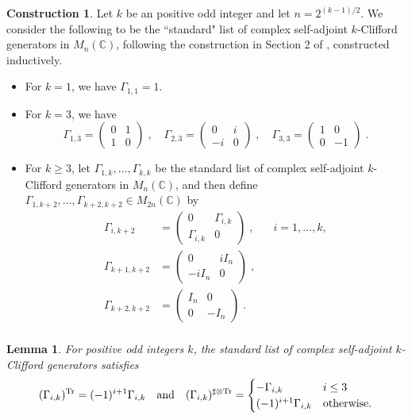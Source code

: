 \documentclass[12pt, reqno]{amsart}
\newtheorem{lemma}[thm]{Lemma}
\theoremstyle{definition}
\newtheorem{const}[thm]{Construction}
\def\C{{\mathbb C}}
\def\T{{\mathbb T}}
\def\T{ ^{\rm{Tr}}}
\def\sT{ ^{\sharp \otimes {\rm{Tr}}}}
\begin{document}
\begin{const}  \label{construction1}
Let $k$ be an positive odd integer and let $n = 2^{(k-1)/2}$. We consider the following to be the ``standard" list of complex self-adjoint $k$-Clifford generators in $M_n(\C)$, following the construction in Section 2 of \cite{SBS}, constructed inductively.
\begin{itemize} 
\item For $k = 1$, we have $\Gamma_{1,1} = 1$.
\item For $k = 3$, we have 
$$\Gamma_{1,3} = \begin{pmatrix} 0 & 1 \\ 1 & 0 \end{pmatrix} \; , \quad
\Gamma_{2,3} =  \begin{pmatrix} 0 & i \\ -i & 0 \end{pmatrix} \; , \quad
\Gamma_{3,3} =  \begin{pmatrix} 1 & 0 \\ 0 & -1 \end{pmatrix} \; .$$
\item For $k \geq 3$, let $\Gamma_{1,k}, \dots, \Gamma_{k,k}$ be the standard list of complex self-adjoint $k$-Clifford generators in $M_n(\C)$, and then define $\Gamma_{1,k+2}, \dots, \Gamma_{k+2,k+2} \in M_{2n}(\C)$ by
\begin{align*}
\Gamma_{i, k+2} &= \begin{pmatrix} 0 & \Gamma_{i, k} \\ \Gamma_{i,k} & 0 \end{pmatrix}  \; , && i = 1, \dots, k, \\
\Gamma_{k+1,k+2} &=  \begin{pmatrix} 0 & i I_{n} \\ -i I_{n} & 0 \end{pmatrix} \; , \\
\Gamma_{k+2, k+2} &=  \begin{pmatrix} I_{n} & 0 \\ 0 & -I_{n}  \end{pmatrix}  \; .\\
\end{align*}
\end{itemize}
\end{const}

\begin{lemma}\label{Lemma:standardlist}
For positive odd integers $k$, the standard list of complex self-adjoint $k$-Clifford generators satisfies
$$
(\Gamma_{i,k})\T = (-1)^{i+1} \Gamma_{i,k} 
\quad \text{and} \quad
(\Gamma_{i,k})\sT = 
\begin{cases} 
-\Gamma_{i,k} & i \leq 3 \\
(-1)^{i+1} \Gamma_{i,k} & \rm{otherwise.}
\end{cases} $$
\end{lemma}
\end{document}
